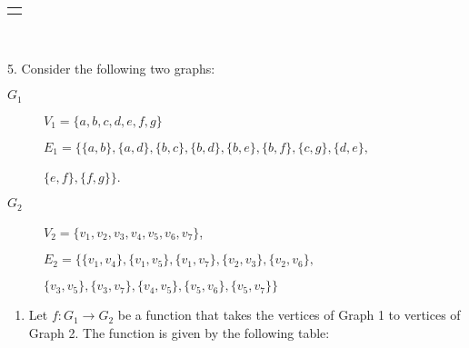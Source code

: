 \documentclass[10pt,]{book}
\theoremstyle{plain}
\theoremstyle{definition}
\theoremstyle{definition}
\theoremstyle{definition}
\theoremstyle{definition}
\numberwithin{equation}{chapter}
\newlength{\panelmax}
\begin{document}
\begin{exerciselist}
{\ifdefined\phAimage\else\newlength{\phAimage}\fi%
\setlength{\phAimage}{\ht\panelboxAimage+\dp\panelboxAimage}
\settototalheight{\phAimage}{\usebox{\panelboxAimage}}
\setlength{\panelmax}{\maxof{\panelmax}{\phAimage}}
\leavevmode%
\setlength{\tabcolsep}{0\linewidth}
\par\medskip\noindent
\hspace*{0.375\linewidth}%
\begin{tabular}{@{}*{1}{c}@{}}
\begin{minipage}[c][\panelmax][t]{0.25\linewidth}\usebox{\panelboxAimage}\end{minipage}\end{tabular}\\
}%
\par\smallskip
\item[5.]\hypertarget{exercise-175}{}\hypertarget{p-1562}{}%
Consider the following two graphs: \leavevmode%
\begin{description}
\item[{\(G_1\)}]\hypertarget{li-706}{}\hypertarget{p-1563}{}%
\(V_1=\{a,b,c,d,e,f,g\}\)%
\par
\hypertarget{p-1564}{}%
\(E_1=\{\{a,b\},\{a,d\},\{b,c\},\{b,d\},\{b,e\},\{b,f\},\{c,g\},\{d,e\},\)%
\par
\hypertarget{p-1565}{}%
\(\{e,f\},\{f,g\}\}\).%
\item[{\(G_2\)}]\hypertarget{li-707}{}\hypertarget{p-1566}{}%
\(V_2=\{v_1,v_2,v_3,v_4,v_5,v_6,v_7\}\),%
\par
\hypertarget{p-1567}{}%
\(E_2=\{\{v_1,v_4\},\{v_1,v_5\},\{v_1,v_7\},\{v_2,v_3\},\{v_2,v_6\},\)%
\par
\hypertarget{p-1568}{}%
\(\{v_3,v_5\},\{v_3,v_7\},\{v_4,v_5\},\{v_5,v_6\},\{v_5,v_7\}\}\)%
\end{description}
%
\par
\hypertarget{p-1569}{}%
\leavevmode%
\begin{enumerate}[label=(\alph*)]
\item\hypertarget{li-708}{}\hypertarget{p-1570}{}%
Let \(f:G_1 \rightarrow G_2\) be a function that takes the vertices of Graph 1 to vertices of Graph 2. The function is given by the following table:%
{%
}
\end{enumerate}
\end{exerciselist}
\end{document}
